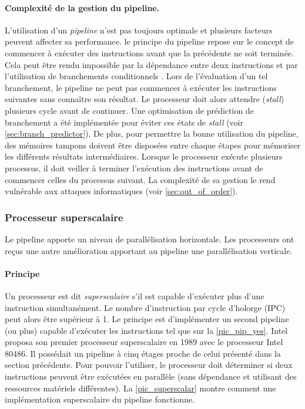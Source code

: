 \paragraph{Complexité de la gestion du pipeline.}
L'utilisation d'un \textit{pipeline} n'est pas toujours optimale et plusieurs facteurs peuvent affecter sa performance. le principe du pipeline repose sur le concept de commencer à exécuter des instructions avant que la précédente ne soit terminée. Cela peut être rendu impossible par la dépendance entre deux instructions et par l'utilisation de branchements conditionnels \cite{emma1987characterization}. Lors de l'évaluation d'un tel branchement, le pipeline ne peut pas commencer à exécuter les instructions suivantes sans connaître son résultat. Le processeur doit alors attendre (\textit{stall}) plusieurs cycle avant de continuer. Une optimisation de prédiction de branchement a été implémentée pour éviter ces états de \textit{stall} (voir \autoref{sec:branch_predictor}). De plus, pour permettre la bonne utilisation du pipeline, des mémoires tampons doivent être disposées entre chaque étapes pour mémoriser les différents résultats intermédiaires. Lorsque le processeur exécute plusieurs processus, il doit veiller à terminer l'exécution des instructions avant de commencer celles du processus suivant. La complexité de sa gestion le rend vulnérable aux attaques informatiques (voir \autoref{sec:out_of_order}). 












\subsubsection{Processeur superscalaire} \label{sec:superscalar}

Le pipeline apporte un niveau de parallélisation horizontale. Les processeurs ont reçus une autre amélioration apportant au pipeline une parallélisation verticale. 

\paragraph{Principe}
Un processeur est dit \textit{superscalaire} s'il est capable d'exécuter plus d'une instruction simultanément. Le nombre d'instruction par cycle d'holorge (IPC) peut alors être supérieur à 1. Le principe est d'implémenter un second pipeline (ou plus) capable d'exécuter les instructions tel que sur la \autoref{pic_pip_yes}. Intel proposa son premier processeur superscalaire en 1989 avec le processeur Intel 80486. Il possédait un pipeline à cinq étages proche de celui présenté dans la section précédente. 
Pour pouvoir l'utiliser, le processeur doit déterminer si deux instructions peuvent être exécutées en parallèle (sans dépendance et utilisant des ressources matériels différentes). La \autoref{pic_superscalar} montre comment une implémentation superscalaire du pipeline fonctionne. 


